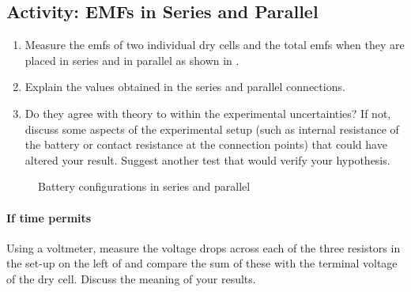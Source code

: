 
\subsection{Activity: EMFs in Series and Parallel}
\begin{enumerate}
	\item Measure the emfs of two individual dry cells and the total emfs when they are placed in series and in parallel as shown in .
	
	\item Explain the values obtained in the series and parallel connections.
	
	\item Do they agree with theory to within the experimental uncertainties?  If not, discuss some aspects of the experimental setup (such as internal resistance of the battery or contact resistance at the connection points) that could have altered your result.  Suggest another test that would verify your hypothesis.
\end{enumerate}

\begin{figure}
	\centering
	\caption{Battery configurations in series and parallel}
	\label{f:vseriespar} %
\end{figure}
\FloatBarrier

\newpage
\paragraph{If time permits}  Using a voltmeter, measure the voltage drops across each of the three resistors in the set-up on the left of  and compare the sum of these with the terminal voltage of the dry cell.  Discuss the meaning of your results.
